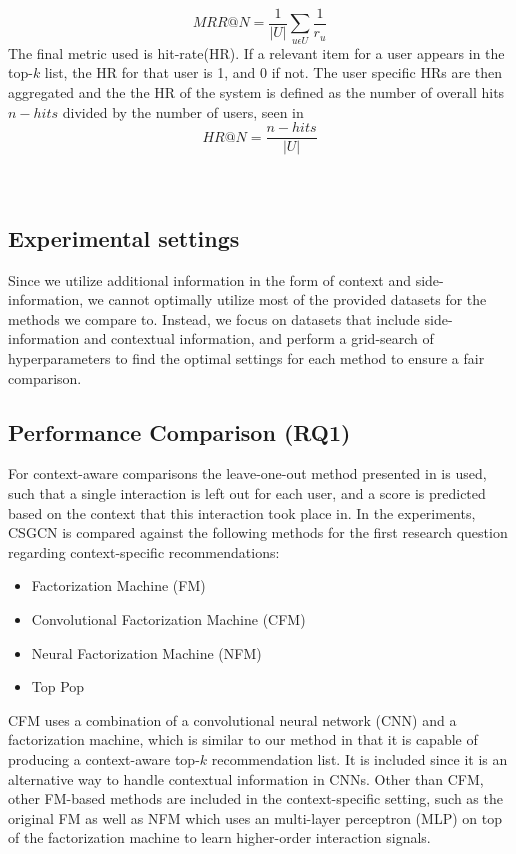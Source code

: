 \begin{equation}
    \label{eqn:mrr}
    MRR@N = \frac{1}{|U|} \sum\limits_{u \epsilon U}\frac{1}{r_u}
\end{equation}
The final metric used is hit-rate(HR).
If a relevant item for a user appears in the top-$k$ list, the HR for that user is 1, and 0 if not. The user specific HRs are then aggregated and the the HR of the system is defined as the number of overall hits $n-hits$ divided by the number of users, seen in  
\begin{equation}
    \label{eqn:hr}
    HR@N = \frac{n-hits}{|U|}
\end{equation}
\\\\

\subsection{Experimental settings}
Since we utilize additional information in the form of context and side-information, we cannot optimally utilize most of the provided datasets for the methods we compare to.
Instead, we focus on datasets that include side-information and contextual information, and perform a grid-search of hyperparameters to find the optimal settings for each method to ensure a fair comparison.

\subsection{Performance Comparison (RQ1)}\label{subsec:rq1}
For context-aware comparisons the leave-one-out method presented in  is used, such that a single interaction is left out for each user, and a score is predicted based on the context that this interaction took place in.
In the experiments, CSGCN is compared against the following methods for the first research question regarding context-specific recommendations:
\begin{itemize}
    \item Factorization Machine (FM)\cite{fmrendle}
    \item Convolutional Factorization Machine (CFM) \cite{CFM}
    \item Neural Factorization Machine (NFM) \cite{NeuralFM}
    \item Top Pop
\end{itemize}
CFM uses a combination of a convolutional neural network (CNN) and a factorization machine, which is similar to our method in that it is capable of producing a context-aware top-$k$ recommendation list.
It is included since it is an alternative way to handle contextual information in CNNs.
Other than CFM, other FM-based methods are included in the context-specific setting, such as the original FM as well as NFM which uses an multi-layer perceptron (MLP) on top of the factorization machine to learn higher-order interaction signals.

